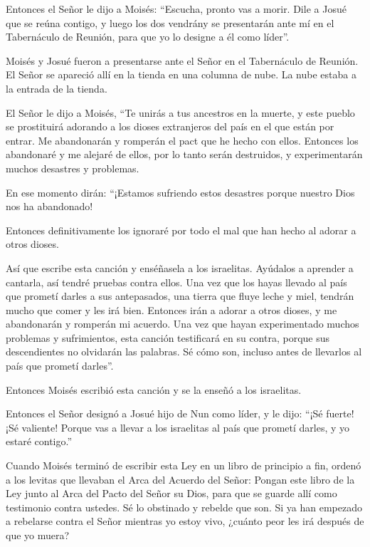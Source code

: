  Entonces el Señor le dijo a Moisés: ``Escucha, pronto vas
a morir. Dile a Josué que se reúna contigo, y luego los dos vendrány se
presentarán ante mí en el Tabernáculo de Reunión, para que yo lo designe
a él como líder''.

Moisés y Josué fueron a presentarse ante el Señor en el Tabernáculo de
Reunión.  El Señor se apareció allí en la tienda en una
columna de nube. La nube estaba a la entrada de la tienda.

 El Señor le dijo a Moisés, ``Te unirás a tus ancestros en
la muerte, y este pueblo se prostituirá adorando a los dioses
extranjeros del país en el que están por entrar. Me abandonarán y
romperán el pact que he hecho con ellos.  Entonces los
abandonaré y me alejaré de ellos, por lo tanto serán destruidos, y
experimentarán muchos desastres y problemas.

En ese momento dirán: ``¡Estamos sufriendo estos desastres porque
nuestro Dios nos ha abandonado!

 Entonces definitivamente los ignoraré por todo el mal que
han hecho al adorar a otros dioses.

 Así que escribe esta canción y enséñasela a los
israelitas. Ayúdalos a aprender a cantarla, así tendré pruebas contra
ellos.  Una vez que los hayas llevado al país que prometí
darles a sus antepasados, una tierra que fluye leche y miel, tendrán
mucho que comer y les irá bien. Entonces irán a adorar a otros dioses, y
me abandonarán y romperán mi acuerdo.  Una vez que hayan
experimentado muchos problemas y sufrimientos, esta canción testificará
en su contra, porque sus descendientes no olvidarán las palabras. Sé
cómo son, incluso antes de llevarlos al país que prometí darles''.

 Entonces Moisés escribió esta canción y se la enseñó a los
israelitas.

 Entonces el Señor designó a Josué hijo de Nun como líder,
y le dijo: ``¡Sé fuerte! ¡Sé valiente! Porque vas a llevar a los
israelitas al país que prometí darles, y yo estaré contigo.''

 Cuando Moisés terminó de escribir esta Ley en un libro de
principio a fin,  ordenó a los levitas que llevaban el Arca
del Acuerdo del Señor:  Pongan este libro de la Ley junto
al Arca del Pacto del Señor su Dios, para que se guarde allí como
testimonio contra ustedes.  Sé lo obstinado y rebelde que
son. Si ya han empezado a rebelarse contra el Señor mientras yo estoy
vivo, ¿cuánto peor les irá después de que yo muera?

